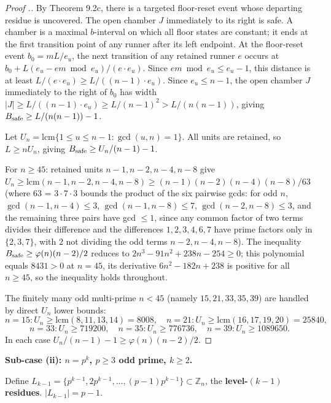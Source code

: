 \documentclass[11pt,a4paper]{article}
\theoremstyle{plain}
\theoremstyle{definition}
\theoremstyle{remark}
\begin{document}
\begin{proof}[Proof .]
By Theorem 9.2c, there is a targeted floor-reset event whose departing residue is uncovered. The open chamber $J$ immediately to its right is safe. A chamber is a maximal $b$-interval on which all floor states are constant; it ends at the first transition point of any runner after its left endpoint. At the floor-reset event $b_0 = mL/e_u$, the next transition of any retained runner $e$ occurs at $b_0 + L(e_u - em \bmod e_u)/(e \cdot e_u)$. Since $em \bmod e_u \leq e_u - 1$, this distance is at least $L/(e \cdot e_u) \geq L/((n-1) \cdot e_u)$. Since $e_u \leq n-1$, the open chamber $J$ immediately to the right of $b_0$ has width $|J| \geq L/((n-1) \cdot e_u) \geq L/(n-1)^2 > L/(n(n-1))$, giving $B_{\rm safe} \geq L/(n(n-1)) - 1$.

Let $U_n = \mathrm{lcm}\{1 \leq u \leq n-1 : \gcd(u,n)=1\}$. All units are retained, so $L \geq n U_n$, giving $B_{\rm safe} \geq U_n/(n-1) - 1$.

For $n \geq 45$: retained units $n-1,n-2,n-4,n-8$ give $U_n \geq \mathrm{lcm}(n-1,n-2,n-4,n-8) \geq (n-1)(n-2)(n-4)(n-8)/63$ (where 63 = $3 \cdot 7 \cdot 3$ bounds the product of the six pairwise gcds: for odd $n$, $\gcd(n-1,n-4) \leq 3$, $\gcd(n-1,n-8) \leq 7$, $\gcd(n-2,n-8) \leq 3$, and the remaining three pairs have gcd $\leq 1$, since any common factor of two terms divides their difference and the differences $1,2,3,4,6,7$ have prime factors only in $\{2,3,7\}$, with $2$ not dividing the odd terms $n-2,n-4,n-8$). The inequality $B_{\rm safe} \geq \varphi(n)(n-2)/2$ reduces to $2n^3 - 91n^2 + 238n - 254 \geq 0$; this polynomial equals $8431 > 0$ at $n=45$, its derivative $6n^2 - 182n + 238$ is positive for all $n \geq 45$, so the inequality holds throughout.

The finitely many odd multi-prime $n < 45$ (namely $15, 21, 33, 35, 39$) are handled by direct $U_n$ lower bounds:
\[n=15: U_n \geq \mathrm{lcm}(8,11,13,14)=8008, \quad n=21: U_n \geq \mathrm{lcm}(16,17,19,20)=25840,\]
\[n=33: U_n \geq 719200, \quad n=35: U_n \geq 776736, \quad n=39: U_n \geq 1089650.\]
In each case $U_n/(n-1)-1 \geq \varphi(n)(n-2)/2$.
\end{proof}


\medskip


\textbf{Sub-case (ii): $n = p^k$, $p \geq 3$ odd prime, $k \geq 2$.}

Define $L_{k-1} = \{p^{k-1}, 2p^{k-1}, \ldots, (p-1)p^{k-1}\} \subset \mathbb{Z}_n$, the \textbf{level-$(k-1)$ residues}. $|L_{k-1}| = p-1$.
\end{document}
